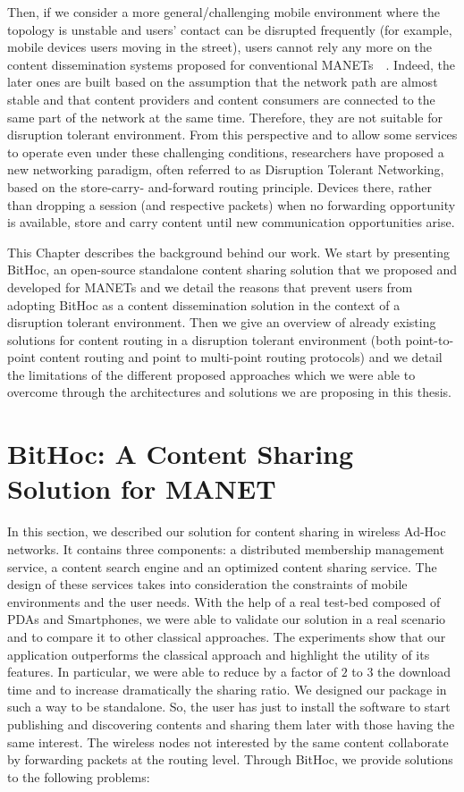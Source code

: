 Then, if we consider a more general/challenging mobile environment where the topology is unstable and users' contact can be disrupted frequently (for example, mobile devices users moving in the street), users cannot rely any more on the content dissemination systems proposed for conventional MANETs~\cite{BitHoc}~\cite{BlueTorrent}. Indeed, the later ones are built based on the assumption that the network path are almost stable and that content providers and content consumers are connected to the same part of the network at the same time. Therefore, they are not suitable for disruption tolerant environment. From this perspective and to allow some services to operate even under
these challenging conditions, researchers have proposed a new networking paradigm, often referred to as Disruption Tolerant Networking, based on the store-carry-
and-forward routing principle. Devices there, rather than dropping a session (and respective packets) when no forwarding opportunity is available, store and carry
content until new communication opportunities arise. 

This Chapter describes the background behind our work. We start by presenting BitHoc, an open-source standalone content sharing solution that we proposed and developed for MANETs and we detail the reasons that prevent users from adopting BitHoc as a content dissemination solution in the context of a disruption tolerant environment. Then we give an overview of already existing solutions for content routing in a disruption tolerant environment (both point-to-point content routing and point to multi-point routing protocols) and we detail the limitations of the different proposed approaches which we were able to overcome through the architectures and solutions we are proposing in this thesis.

\section{BitHoc: A Content Sharing Solution for MANET}

In this section, we described our solution for content sharing in wireless Ad-Hoc networks. It contains three components: a distributed membership management service, a content search engine and an optimized content sharing service. The design of these services takes into consideration the constraints of mobile environments and the user needs. With the help of a real test-bed composed of PDAs and Smartphones, we were able to validate our solution in a real scenario and to compare it to other classical approaches. The experiments show that our application outperforms the classical approach and highlight the utility of its features. In particular, we were able to reduce by a factor of $2$ to $3$ the download time and to increase dramatically the sharing ratio. We designed our package in such a way to be standalone. So, the user has just to install the software to start publishing and discovering contents and sharing them later with those having the same interest. The wireless nodes not interested by the same content collaborate by forwarding packets at the routing level. Through BitHoc, we provide solutions to the following problems:

